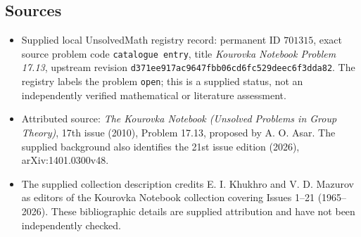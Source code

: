 \documentclass[11pt]{article}
\begin{document}
\subsection{Sources}
\begin{itemize}
\item Supplied local UnsolvedMath registry record: permanent ID \(701315\), exact source problem code \texttt{catalogue entry}, title \emph{Kourovka Notebook Problem 17.13}, upstream revision \texttt{d371ee917ac9647fbb06cd6fc529deec6f3dda82}. The registry labels the problem \texttt{open}; this is a supplied status, not an independently verified mathematical or literature assessment.
\item Attributed source: \emph{The Kourovka Notebook (Unsolved Problems in Group Theory)}, 17th issue (2010), Problem 17.13, proposed by A. O. Asar. The supplied background also identifies the 21st issue edition (2026), arXiv:1401.0300v48.
\item The supplied collection description credits E. I. Khukhro and V. D. Mazurov as editors of the Kourovka Notebook collection covering Issues 1--21 (1965--2026). These bibliographic details are supplied attribution and have not been independently checked.
\end{itemize}
\end{document}
